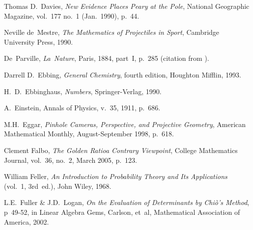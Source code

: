 \begin{thebibliography}{\makebox[2em][c]{{}\hfil{}}}
  Thomas D.~Davies,
  \emph{New Evidence Places Peary at the Pole},
  National Geographic Magazine,
  vol.~177 no.~1 (Jan.~1990),
  p.~44.

  Neville de~Mestre,
  \emph{The Mathematics of Projectiles in Sport},
  Cambridge University Press,
  1990.

 De~Parville,
 \emph{La~Nature},
 Paris, 1884,
 part~I,
 p.~285
 (citation from \cite{Ball}).



  Darrell D.~Ebbing,
  \emph{General Chemistry},
  fourth edition,
  Houghton Mifflin,
  1993.

  H.\ D.\ Ebbinghaus,
  \emph{Numbers},
  Springer-Verlag,
  1990.

  A.~Einstein,
  Annals of Physics,
  v.~35, 1911,
  p.~686.

  M.H.~Eggar,
  \emph{Pinhole Cameras, Perspective, and Projective Geometry},
  American Mathematical Monthly,
  August-September 1998,
  p.~618.

  Clement Falbo,
  \emph{The Golden Ratio\Dash a Contrary Viewpoint},
  College Mathematics Journal,
  vol.~36, no.~2, March 2005,
  p.~123.

  William Feller,
  \emph{An Introduction to Probability Theory and Its Applications}
  (vol.~1, 3rd~ed.),
  John Wiley, 1968.



  L.E.~Fuller \& J.D.~Logan,
  \emph{On the Evaluation of Determinants by Chi\`o's Method},
  p~49-52, in Linear Algebra Gems,
  Carlson, et~al,
  Mathematical Association of America,  
  2002.


\end{thebibliography}
